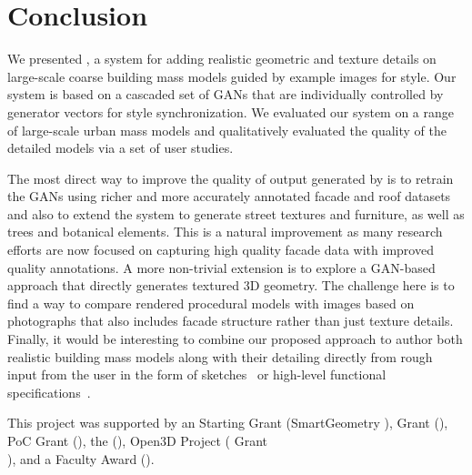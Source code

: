 \section{Conclusion}


We presented \systemName, a system for adding realistic geometric and texture details on large-scale coarse building mass models guided by example images for style. Our system is based on a cascaded set of GANs that are individually controlled by generator vectors for style synchronization. We evaluated our system on a range of large-scale urban mass models and qualitatively evaluated the quality of the detailed models via a set of user studies. 


The most direct way to improve the quality of output generated by \systemName is to retrain the GANs using richer and more accurately annotated facade and roof datasets and also to extend the system to generate street textures and furniture, as well as trees and botanical elements. This is a natural improvement as many research efforts are now focused on capturing high quality facade data with improved quality annotations. 
%
A more non-trivial extension is to explore a GAN-based approach that directly generates textured 3D geometry. 
The challenge here is to find a way to compare rendered procedural models with images based on photographs that also includes facade structure rather than just texture details.
%
Finally, it would be interesting to combine our proposed approach to author both realistic building mass models along with their detailing directly from rough input from the user in the form of sketches~\cite{Nishida:2016:ISU:2897824.2925951} or high-level functional specifications~\cite{Peng:2016:CND}.

\begin{acks}
This project was supported by an  Starting Grant (SmartGeometry ),  Grant (),  PoC Grant (), the  (), Open3D Project ( Grant \\ ), and a  Faculty Award ().
\end{acks}
